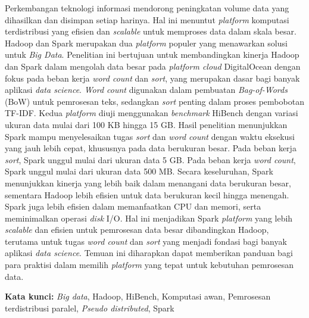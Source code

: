 \begin{abstractind}
\justifying

Perkembangan teknologi informasi mendorong peningkatan volume data yang dihasilkan dan disimpan setiap harinya. Hal ini menuntut \textit{platform} komputasi terdistribusi yang efisien dan \textit{scalable} untuk memproses data dalam skala besar. Hadoop dan Spark merupakan dua \textit{platform} populer yang menawarkan solusi untuk \textit{Big Data}. Penelitian ini bertujuan untuk membandingkan kinerja Hadoop dan Spark dalam mengolah data besar pada \textit{platform cloud} DigitalOcean dengan fokus pada beban kerja \textit{word count} dan \textit{sort}, yang merupakan dasar bagi banyak aplikasi \textit{data science}. \textit{Word count} digunakan dalam pembuatan \textit{Bag-of-Words} (BoW) untuk pemrosesan teks, sedangkan \textit{sort} penting dalam proses pembobotan TF-IDF. Kedua \textit{platform} diuji menggunakan \textit{benchmark} HiBench dengan variasi ukuran data mulai dari 100 KB hingga 15 GB. Hasil penelitian menunjukkan Spark mampu menyelesaikan tugas \textit{sort} dan \textit{word count} dengan waktu eksekusi yang jauh lebih cepat, khususnya pada data berukuran besar. Pada beban kerja \textit{sort}, Spark unggul mulai dari ukuran data 5 GB. Pada beban kerja \textit{word count}, Spark unggul mulai dari ukuran data 500 MB. Secara keseluruhan, Spark menunjukkan kinerja yang lebih baik dalam menangani data berukuran besar, sementara Hadoop lebih efisien untuk data berukuran kecil hingga menengah. Spark juga lebih efisien dalam memanfaatkan CPU dan memori, serta meminimalkan operasi \textit{disk} I/O. Hal ini menjadikan Spark \textit{platform} yang lebih \textit{scalable} dan efisien untuk pemrosesan data besar dibandingkan Hadoop, terutama untuk tugas \textit{word count} dan \textit{sort} yang menjadi fondasi bagi banyak aplikasi \textit{data science}. Temuan ini diharapkan dapat memberikan panduan bagi para praktisi dalam memilih \textit{platform} yang tepat untuk kebutuhan pemrosesan data.

\bigskip
\noindent
\textbf{Kata kunci:} \textit{Big data}, Hadoop, HiBench, Komputasi awan, Pemrosesan terdistribusi paralel, \textit{Pseudo distributed}, Spark %
\end{abstractind}
